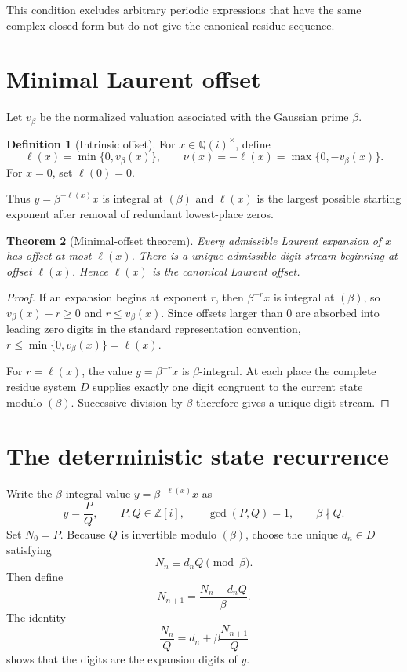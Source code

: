 \documentclass[11pt]{article}
\newtheorem{theorem}{Theorem}[section]
\theoremstyle{definition}
\newtheorem{definition}[theorem]{Definition}
\newcommand{\Zi}{\mathbb{Z}[i]}
\newcommand{\Qi}{\mathbb{Q}(i)}
\begin{document}
This condition excludes arbitrary periodic expressions that have the same complex closed form but do not give the canonical residue sequence.

\section{Minimal Laurent offset}

Let $v_\beta$ be the normalized valuation associated with the Gaussian prime $\beta$.

\begin{definition}[Intrinsic offset]
For $x\in\Qi^\times$, define
\[
\ell(x)=\min\{0,v_\beta(x)\},
\qquad
\nu(x)=-\ell(x)=\max\{0,-v_\beta(x)\}.
\]
For $x=0$, set $\ell(0)=0$.
\end{definition}

Thus $y=\beta^{-\ell(x)}x$ is integral at $(\beta)$ and $\ell(x)$ is the largest possible starting exponent after removal of redundant lowest-place zeros.

\begin{theorem}[Minimal-offset theorem]
Every admissible Laurent expansion of $x$ has offset at most $\ell(x)$.  There is a unique admissible digit stream beginning at offset $\ell(x)$.  Hence $\ell(x)$ is the canonical Laurent offset.
\end{theorem}

\begin{proof}
If an expansion begins at exponent $r$, then $\beta^{-r}x$ is integral at $(\beta)$, so $v_\beta(x)-r\ge0$ and $r\le v_\beta(x)$.  Since offsets larger than $0$ are absorbed into leading zero digits in the standard representation convention, $r\le\min\{0,v_\beta(x)\}=\ell(x)$.

For $r=\ell(x)$, the value $y=\beta^{-r}x$ is $\beta$-integral.  At each place the complete residue system $D$ supplies exactly one digit congruent to the current state modulo $(\beta)$.  Successive division by $\beta$ therefore gives a unique digit stream.
\end{proof}

\section{The deterministic state recurrence}

Write the $\beta$-integral value $y=\beta^{-\ell(x)}x$ as
\[
y=\frac{P}{Q},
\qquad P,Q\in\Zi,
\qquad \gcd(P,Q)=1,
\qquad \beta\nmid Q.
\]
Set $N_0=P$.  Because $Q$ is invertible modulo $(\beta)$, choose the unique $d_n\in D$ satisfying
\[
N_n\equiv d_nQ\pmod\beta.
\]
Then define
\[
N_{n+1}=\frac{N_n-d_nQ}{\beta}.
\]
The identity
\[
\frac{N_n}{Q}=d_n+\beta\frac{N_{n+1}}{Q}
\]
shows that the digits are the expansion digits of $y$.
\end{document}
